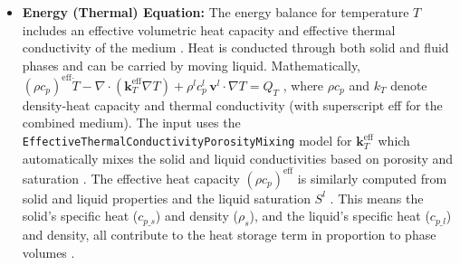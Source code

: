 \documentclass[10pt,a4paper]{article}
\begin{document}
\begin{itemize}
    \item \textbf{Energy (Thermal) Equation:} The energy balance for temperature $T$ includes an effective volumetric heat capacity and effective thermal conductivity of the medium \cite{ogs:trm}. Heat is conducted through both solid and fluid phases and can be carried by moving liquid. Mathematically, $(\rho c_p)^{\text{eff}} \dot{T} - \nabla\cdot(\mathbf{k}_T^{\text{eff}}\nabla T) + \rho^l c_p^l\,\mathbf{v}^l\cdot\nabla T = Q_T$ \cite{ogs:trm}, where $\rho c_p$ and $k_T$ denote density-heat capacity and thermal conductivity (with superscript eff for the combined medium). The input uses the \texttt{EffectiveThermalConductivityPorosityMixing} model for $\mathbf{k}_T^{\text{eff}}$ \cite{file:04_media_TRM} which automatically mixes the solid and liquid conductivities based on porosity and saturation \cite{ogs:trm}. The effective heat capacity $(\rho c_p)^{\text{eff}}$ is similarly computed from solid and liquid properties and the liquid saturation $S^l$ \cite{ogs:trm}. This means the solid's specific heat ($c_{p\_s}$) and density ($\rho_s$), and the liquid's specific heat ($c_{p\_l}$) and density, all contribute to the heat storage term in proportion to phase volumes \cite{ogs:trm}.


\end{itemize}
\end{document}
